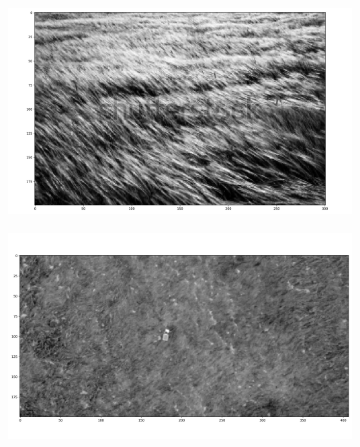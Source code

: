 \documentclass[
  letterpaper,
  DIV=11,
  numbers=noendperiod]{scrreprt}
\begin{document}
\begin{figure}

\begin{minipage}{0.33\linewidth}

\begin{figure}[H]

{\centering \includegraphics{images/plots/grass/0.jpg}

}


\end{figure}%

\end{minipage}%
%
\begin{minipage}{0.33\linewidth}

\begin{figure}[H]

{\centering \includegraphics{images/plots/grass/1.jpg}

}



\end{figure}
\end{minipage}
\end{figure}
\end{document}
